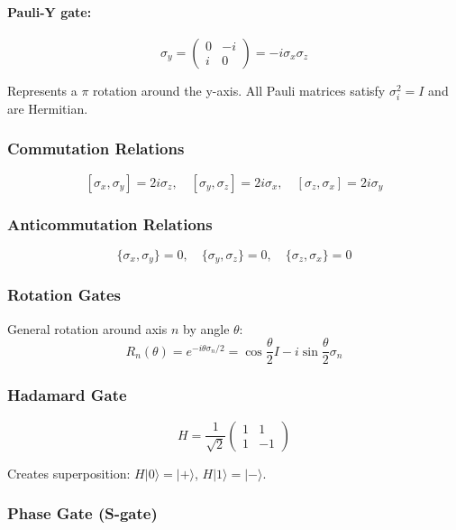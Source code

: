\documentclass{article}
\begin{document}
\paragraph{Pauli-Y gate:}
$$\sigma_y = \begin{pmatrix} 0 & -i \\ i & 0 \end{pmatrix} = -i\sigma_x\sigma_z$$

Represents a $\pi$ rotation around the y-axis. All Pauli matrices satisfy $\sigma_i^2 = I$ and are Hermitian.

\subsubsection*{Commutation Relations}

$$[\sigma_x, \sigma_y] = 2i\sigma_z, \quad [\sigma_y, \sigma_z] = 2i\sigma_x, \quad [\sigma_z, \sigma_x] = 2i\sigma_y$$

\subsubsection*{Anticommutation Relations}

$$\{\sigma_x, \sigma_y\} = 0, \quad \{\sigma_y, \sigma_z\} = 0, \quad \{\sigma_z, \sigma_x\} = 0$$

\subsubsection*{Rotation Gates}

General rotation around axis $n$ by angle $\theta$:
$$R_n(\theta) = e^{-i\theta\sigma_n/2} = \cos\frac{\theta}{2}I - i\sin\frac{\theta}{2}\sigma_n$$

\subsubsection*{Hadamard Gate}

$$H = \frac{1}{\sqrt{2}}\begin{pmatrix} 1 & 1 \\ 1 & -1 \end{pmatrix}$$

Creates superposition: $H|0\rangle = |+\rangle$, $H|1\rangle = |-\rangle$.

\subsubsection*{Phase Gate (S-gate)}
\end{document}
